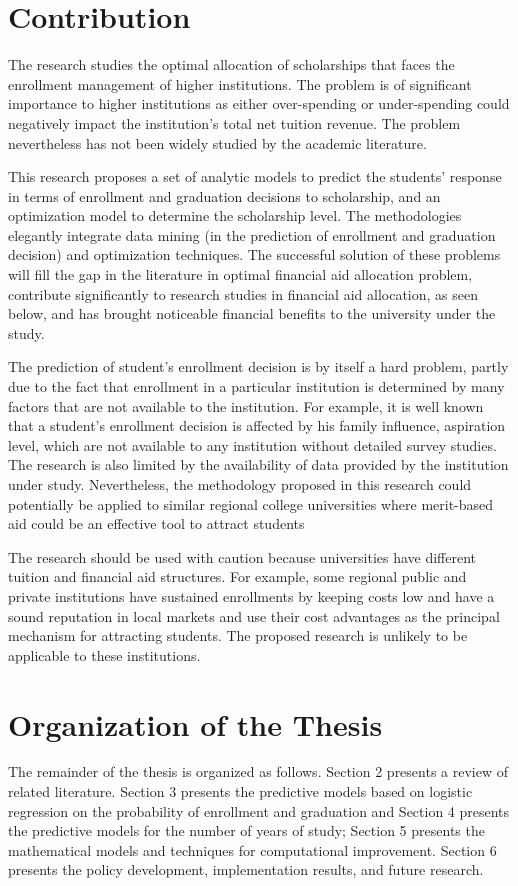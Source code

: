 \documentclass[12pt,english]{report}
\begin{document}
\section{Contribution}

The research studies the optimal allocation of scholarships that faces the
enrollment management of higher institutions.  The problem is of significant
importance to higher institutions as either over-spending or under-spending
could negatively impact the institution's total net tuition revenue.  The
problem nevertheless has not been widely studied by the academic literature.

This research proposes a set of analytic models to predict the students'
response in terms of enrollment and graduation decisions to scholarship, and an
optimization model to determine the scholarship level.  The methodologies
elegantly integrate data mining (in the prediction of enrollment and
graduation decision) and optimization techniques. The successful solution of
these problems will fill the gap in the literature in optimal financial aid
allocation problem, contribute significantly to research studies in financial
aid allocation, as seen below, and has brought noticeable financial benefits to
the university under the study.

The prediction of student's enrollment decision is by itself a hard problem,
partly due to the fact that enrollment in a particular institution is
determined
by many factors that are not available to the institution.  For example, it is
well known that a student's enrollment decision is affected by his family
influence, aspiration level, which are not available to any institution without
detailed survey studies.  The research is also limited by the availability of
data provided by the institution under study.   Nevertheless, the methodology
proposed in this research could potentially be applied to similar regional
college universities where merit-based aid could be an effective tool to attract
students

The research should be used with caution because universities have different
tuition and financial aid structures.  For example, some regional public and
private institutions have sustained enrollments by keeping costs low and have a
sound reputation in local markets and use their cost advantages as the
principal mechanism for attracting students.  The proposed research is unlikely
to be applicable to these institutions.

\section{Organization of the Thesis}
\vspace{0.25in}
The remainder of the thesis is organized as follows. Section 2 presents a
review of related literature. Section 3 presents the predictive models based on
logistic regression on the probability of enrollment and graduation and Section
4 presents the predictive models for the number of years of study; Section 5
presents the mathematical models and techniques for computational improvement.
Section 6 presents the policy development, implementation results, and future
research.
\end{document}

